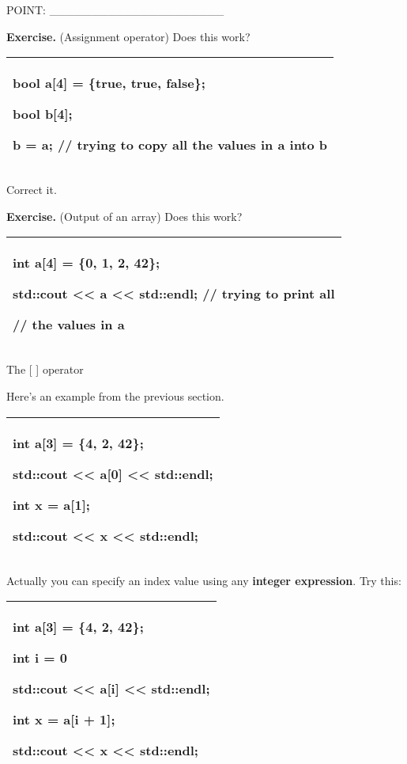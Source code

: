 \documentclass[
]{article}
\begin{document}
POINT: \_\_\_\_\_\_\_\_\_\_\_\_\_\_\_\_\_\_\_\_\_

\textbf{Exercise.} (Assignment operator) Does this work?

\begin{longtable}[]{@{}l@{}}
\toprule
\endhead
\begin{minipage}[t]{0.97\columnwidth}\raggedright
bool a{[}4{]} = \{true, true, false\};

bool b{[}4{]};

b = a; // trying to copy all the values in a into b\strut
\end{minipage}\tabularnewline
\bottomrule
\end{longtable}

Correct it.

\textbf{Exercise.} (Output of an array) Does this work?

\begin{longtable}[]{@{}l@{}}
\toprule
\endhead
\begin{minipage}[t]{0.97\columnwidth}\raggedright
int a{[}4{]} = \{0, 1, 2, 42\};

std::cout \textless\textless{} a \textless\textless{} std::endl; //
trying to print all

// the values in a\strut
\end{minipage}\tabularnewline
\bottomrule
\end{longtable}

The {[} {]} operator

Here's an example from the previous section.

\begin{longtable}[]{@{}l@{}}
\toprule
\endhead
\begin{minipage}[t]{0.97\columnwidth}\raggedright
int a{[}3{]} = \{4, 2, 42\};

std::cout \textless\textless{} a{[}0{]} \textless\textless{} std::endl;

int x = a{[}1{]};

std::cout \textless\textless{} x \textless\textless{} std::endl; \strut
\end{minipage}\tabularnewline
\bottomrule
\end{longtable}

Actually you can specify an index value using any \textbf{integer
expression}. Try this:

\begin{longtable}[]{@{}l@{}}
\toprule
\endhead
\begin{minipage}[t]{0.97\columnwidth}\raggedright
int a{[}3{]} = \{4, 2, 42\};

int i = 0

std::cout \textless\textless{} a{[}i{]} \textless\textless{} std::endl;

int x = a{[}i + 1{]};

std::cout \textless\textless{} x \textless\textless{} std::endl; \strut
\end{minipage}\tabularnewline
\bottomrule
\end{longtable}
\end{document}
